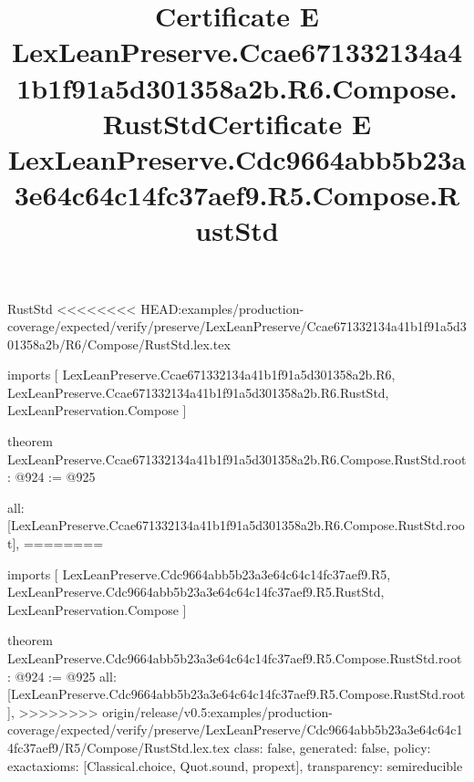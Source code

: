 \begin{lexlean}{RustStd}
<<<<<<<< HEAD:examples/production-coverage/expected/verify/preserve/LexLeanPreserve/Ccae671332134a41b1f91a5d301358a2b/R6/Compose/RustStd.lex.tex
\title{Certificate E LexLeanPreserve.Ccae671332134a41b1f91a5d301358a2b.R6.Compose.RustStd}
\begin{coremodule}
imports [
  LexLeanPreserve.Ccae671332134a41b1f91a5d301358a2b.R6,
  LexLeanPreserve.Ccae671332134a41b1f91a5d301358a2b.R6.RustStd,
  LexLeanPreservation.Compose
]

theorem LexLeanPreserve.Ccae671332134a41b1f91a5d301358a2b.R6.Compose.RustStd.root : @924 := @925 {
  all: [LexLeanPreserve.Ccae671332134a41b1f91a5d301358a2b.R6.Compose.RustStd.root],
========
\title{Certificate E LexLeanPreserve.Cdc9664abb5b23a3e64c64c14fc37aef9.R5.Compose.RustStd}
\begin{coremodule}
imports [
  LexLeanPreserve.Cdc9664abb5b23a3e64c64c14fc37aef9.R5,
  LexLeanPreserve.Cdc9664abb5b23a3e64c64c14fc37aef9.R5.RustStd,
  LexLeanPreservation.Compose
]

theorem LexLeanPreserve.Cdc9664abb5b23a3e64c64c14fc37aef9.R5.Compose.RustStd.root : @924 := @925 {
  all: [LexLeanPreserve.Cdc9664abb5b23a3e64c64c14fc37aef9.R5.Compose.RustStd.root],
>>>>>>>> origin/release/v0.5:examples/production-coverage/expected/verify/preserve/LexLeanPreserve/Cdc9664abb5b23a3e64c64c14fc37aef9/R5/Compose/RustStd.lex.tex
  class: false,
  generated: false,
  policy: exact{axioms: [Classical.choice, Quot.sound, propext]},
  transparency: semireducible
}


\end{coremodule}}
\end{coremodule}
\end{lexlean}
